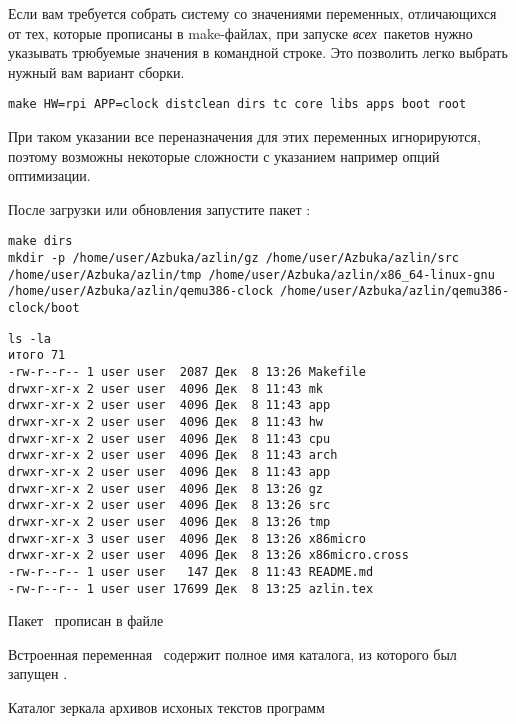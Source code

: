
Если вам требуется собрать систему со значениями переменных, отличающихся от
тех, которые прописаны в make-файлах, при запуске \emph{всех}\ пакетов нужно
указывать трюбуемые значения в командной строке. Это позволить легко выбрать
нужный вам вариант сборки.

\begin{verbatim}
make HW=rpi APP=clock distclean dirs tc core libs apps boot root
\end{verbatim}

При таком указании все переназначения для этих переменных игнорируются, поэтому
возможны некоторые сложности с указанием например опций оптимизации.

 \label{azdirs}

После загрузки или обновления запустите пакет :

\begin{verbatim}
make dirs
mkdir -p /home/user/Azbuka/azlin/gz /home/user/Azbuka/azlin/src
/home/user/Azbuka/azlin/tmp /home/user/Azbuka/azlin/x86_64-linux-gnu
/home/user/Azbuka/azlin/qemu386-clock /home/user/Azbuka/azlin/qemu386-clock/boot
\end{verbatim}
\begin{verbatim}
ls -la
итого 71
-rw-r--r-- 1 user user  2087 Дек  8 13:26 Makefile
drwxr-xr-x 2 user user  4096 Дек  8 11:43 mk
drwxr-xr-x 2 user user  4096 Дек  8 11:43 app
drwxr-xr-x 2 user user  4096 Дек  8 11:43 hw
drwxr-xr-x 2 user user  4096 Дек  8 11:43 cpu
drwxr-xr-x 2 user user  4096 Дек  8 11:43 arch
drwxr-xr-x 2 user user  4096 Дек  8 11:43 app
drwxr-xr-x 2 user user  4096 Дек  8 13:26 gz
drwxr-xr-x 2 user user  4096 Дек  8 13:26 src
drwxr-xr-x 2 user user  4096 Дек  8 13:26 tmp
drwxr-xr-x 3 user user  4096 Дек  8 13:26 x86micro
drwxr-xr-x 2 user user  4096 Дек  8 13:26 x86micro.cross
-rw-r--r-- 1 user user   147 Дек  8 11:43 README.md
-rw-r--r-- 1 user user 17699 Дек  8 13:25 azlin.tex
\end{verbatim}

Пакет \ прописан в файле


Встроенная переменная \ содержит полное имя каталога, из которого был
запущен .

\bigskip
Каталог зеркала архивов исхоных текстов программ


